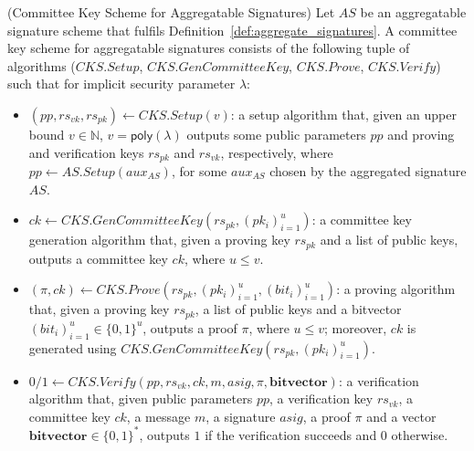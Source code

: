 \begin{definition}
\label{def: committee_key} (Committee Key Scheme for Aggregatable Signatures) Let $\mathit{AS}$ be an aggregatable signature scheme that fulfils 
Definition~\ref{def:aggregate_signatures}.  A committee key scheme for aggregatable signatures consists of the following tuple of algorithms 
($\mathit{CKS.Setup}$, $\mathit{CKS.GenCommitteeKey}$, $\mathit{CKS.Prove}$, $\mathit{CKS.Verify}$) 
such that for implicit security parameter $\lambda$: 

\begin{itemize}
\item $(\mathit{pp}, \mathit{rs}_{\mathit{vk}}, \mathit{rs}_{\mathit{pk}}) \leftarrow \mathit{CKS.Setup}(v)$: a setup algorithm that, 
given an upper bound $v \in \mathbb{N}$, $v = \mathsf{poly}(\lambda)$ outputs some public parameters $\mathit{pp}$ and 
proving and verification keys $\mathit{rs}_{\mathit{pk}}$ and $\mathit{rs}_{\mathit{vk}}$, respectively,  
where $\mathit{pp} \leftarrow \mathit{AS.Setup}(\mathit{aux_{\mathit{AS}}})$, for some 
$\mathit{aux_{\mathit{AS}}}$ chosen by the aggregated signature $\mathit{AS}$.

\item $\mathit{ck} \leftarrow \mathit{CKS.GenCommitteeKey}(\mathit{rs}_{\mathit{pk}}, (\mathit{pk_i})_{i=1}^u)$: a committee key generation algorithm that, 
given a proving key $\mathit{rs}_{\mathit{pk}}$ and a list of public keys, 
outputs a committee key $\mathit{ck}$, where $u \leq v$.

\item $(\pi, \mathit{ck}) \leftarrow \mathit{CKS.Prove}(\mathit{rs}_{\mathit{pk}}, (\mathit{pk_i})_{i=1}^u, (\mathit{bit_i})_{i=1}^u)$: a proving algorithm that, 
given a proving key $\mathit{rs}_{\mathit{pk}}$, a list of public keys and a bitvector $(\mathit{bit_i})_{i=1}^u \in \{0,1\}^u$,  
outputs a proof $\pi$, where $u \leq v$; moreover, $\mathit{ck}$ is generated using  $\mathit{CKS.GenCommitteeKey}(\mathit{rs}_{\mathit{pk}}, (\mathit{pk_i})_{i=1}^u)$.
 
\item $0/1 \leftarrow \mathit{CKS.Verify}(\mathit{pp}, \mathit{rs}_{\mathit{vk}}, \mathit{ck}, m, \mathit{asig}, \pi, \mathbf{bitvector})$: a verification algorithm that, 
given public parameters $\mathit{pp}$, a verification key $\mathit{rs}_{\mathit{vk}}$, a committee key $\mathit{ck}$, a message $m$, a 
signature $\mathit{asig}$, a proof $\pi$ and a vector $\mathbf{bitvector} \in \{0,1\}^*$, 
outputs $1$ if the verification succeeds and $0$ otherwise. 
\end{itemize}


\end{definition}
